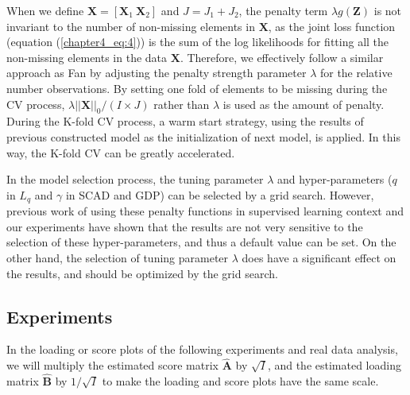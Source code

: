 When we define $\mathbf{X}=[\mathbf{X}_1 ~ \mathbf{X}_2]$ and $J=J_1+J_2$, the penalty term $\lambda g(\mathbf{Z})$ is not invariant to the number of non-missing elements in $\mathbf{X}$, as the joint loss function (equation (\ref{chapter4_eq:4})) is the sum of the log likelihoods for fitting all the non-missing elements in the data $\mathbf{X}$. Therefore, we effectively follow a similar approach as Fan \cite{fan2001variable} by adjusting the penalty strength parameter $\lambda$ for the relative number observations. By setting one fold of elements to be missing during the CV process, $\lambda||\mathbf{X}||_0/(I\times J)$ rather than $\lambda$ is used as the amount of penalty. During the K-fold CV process, a warm start strategy, using the results of previous constructed model as the initialization of next model, is applied. In this way, the K-fold CV can be greatly accelerated.

In the model selection process, the tuning parameter $\lambda$ and hyper-parameters ($q$ in $L_{q}$ and $\gamma$ in SCAD and GDP) can be selected by a grid search. However, previous work of using these penalty functions in supervised learning context \cite{fu1998penalized,fan2001variable,armagan2013generalized} and our experiments have shown that the results are not very sensitive to the selection of these hyper-parameters, and thus a default value can be set. On the other hand, the selection of tuning parameter $\lambda$ does have a significant effect on the results, and should be optimized by the grid search.

\subsection{Experiments}
In the loading or score plots of the following experiments and real data analysis, we will multiply the estimated score matrix $\hat{\mathbf{A}}$ by $\sqrt{I}$, and the estimated loading matrix $\hat{\mathbf{B}}$ by $1/\sqrt{I}$ to make the loading and score plots have the same scale.

